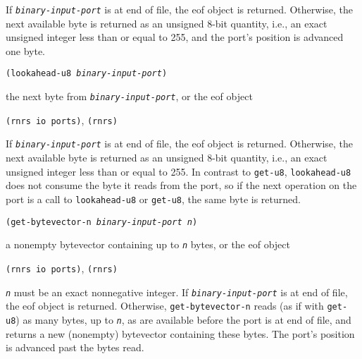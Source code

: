 If \texttt{\textit{binary-input-port}} is at end of file, the eof object is returned.
Otherwise, the next available byte is returned as an unsigned 8-bit
quantity, i.e., an exact unsigned integer less than or equal to 255,
and the port's position is advanced one byte.


\begin{description}

\label{io_s56}\item[procedure] \texttt{(lookahead-u8 \textit{binary-input-port})}



\item[returns] the next byte from \texttt{\textit{binary-input-port}}, or the eof object


\item[libraries] \texttt{(rnrs io ports)}, \texttt{(rnrs)}
\end{description}


If \texttt{\textit{binary-input-port}} is at end of file, the eof object is returned.
Otherwise, the next available byte is returned as an unsigned 8-bit
quantity, i.e., an exact unsigned integer less than or equal to 255.
In contrast to \texttt{get-u8}, \texttt{lookahead-u8} does not consume
the byte it reads from the port, so if the next operation on the port
is a call to \texttt{lookahead-u8} or \texttt{get-u8}, the same
byte is returned.


\begin{description}

\label{io_s57}\item[procedure] \texttt{(get-bytevector-n \textit{binary-input-port} \textit{n})}



\item[returns] a nonempty bytevector containing up to \texttt{\textit{n}} bytes, or the eof object


\item[libraries] \texttt{(rnrs io ports)}, \texttt{(rnrs)}
\end{description}

\texttt{\textit{n}} must be an exact nonnegative integer.
If \texttt{\textit{binary-input-port}} is at end of file, the eof object is returned.
Otherwise, \texttt{get-bytevector-n} reads (as if with \texttt{get-u8})
as many bytes, up to \texttt{\textit{n}}, as are available before the port is at end
of file, and returns a new (nonempty) bytevector containing these bytes.
The port's position is advanced past the bytes read.

